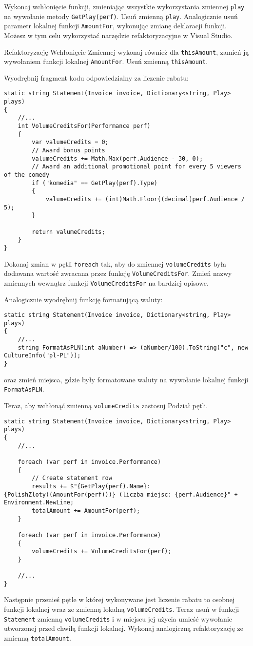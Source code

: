 Wykonaj wchłonięcie funkcji, zmieniając wszystkie wykorzystania zmiennej \texttt{play} na wywołanie metody \texttt{GetPlay(perf)}. Usuń zmienną \texttt{play}. Analogicznie usuń parametr lokalnej funkcji \texttt{AmountFor}, wykonując zmianę deklaracji funkcji. Możesz w tym celu wykorzystać narzędzie refaktoryzacyjne w Visual Studio. 

Refaktoryzację Wchłonięcie Zmiennej wykonaj również dla \texttt{thisAmount}, zamień ją wywołaniem funkcji lokalnej \texttt{AmountFor}. Usuń zmienną \texttt{thisAmount}.

Wyodrębnij fragment kodu odpowiedzialny za liczenie rabatu:
\begin{lstlisting}
static string Statement(Invoice invoice, Dictionary<string, Play> plays)
{
	//...
	int VolumeCreditsFor(Performance perf)
	{
		var valumeCredits = 0;
		// Award bonus points
		valumeCredits += Math.Max(perf.Audience - 30, 0);
		// Award an additional promotional point for every 5 viewers of the comedy
		if ("komedia" == GetPlay(perf).Type)
		{
			valumeCredits += (int)Math.Floor((decimal)perf.Audience / 5);
		}
		
		return valumeCredits;
	}	
}
\end{lstlisting}
Dokonaj zmian w pętli \texttt{foreach} tak, aby do zmiennej \texttt{volumeCredits} była dodawana wartość zwracana przez funkcję \texttt{VolumeCreditsFor}. Zmień nazwy zmiennych wewnątrz funkcji \texttt{VolumeCreditsFor} na bardziej opisowe. 


Analogicznie wyodrębnij funkcję formatującą waluty:
\begin{lstlisting}
static string Statement(Invoice invoice, Dictionary<string, Play> plays)
{
	//...
	string FormatAsPLN(int aNumber) => (aNumber/100).ToString("c", new CultureInfo("pl-PL"));
}	

\end{lstlisting}
oraz zmień miejsca, gdzie były formatowane waluty na wywołanie lokalnej funkcji \texttt{FormatAsPLN}.

Teraz, aby wchłonąć zmienną \texttt{volumeCredits} zastosuj Podział pętli. 
\begin{lstlisting}
static string Statement(Invoice invoice, Dictionary<string, Play> plays)
{
	//...	
	
	foreach (var perf in invoice.Performance)
	{
		// Create statement row
		results += $"{GetPlay(perf).Name}: {PolishZloty((AmountFor(perf)))} (liczba miejsc: {perf.Audience}" + Environment.NewLine;
		totalAmount += AmountFor(perf);
	}
	
	foreach (var perf in invoice.Performance)
	{
		volumeCredits += VolumeCreditsFor(perf);
	}
	
	//...
}
\end{lstlisting}
Następnie przenieś pętle w której wykonywane jest liczenie rabatu to osobnej funkcji lokalnej wraz ze zmienną lokalną \texttt{volumeCredits}. Teraz usuń w funkcji \texttt{Statement} zmienną \texttt{volumeCredits} i w miejscu jej użycia umieść wywołanie utworzonej przed chwilą funkcji lokalnej. Wykonaj analogiczną refaktoryzację ze zmienną \texttt{totalAmount}.



